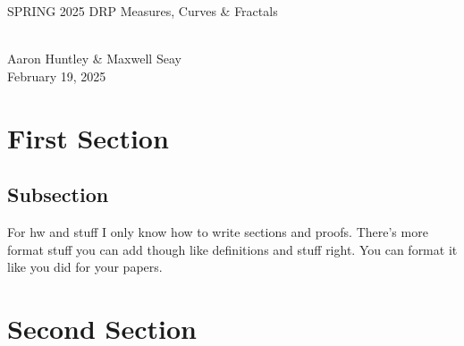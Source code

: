 \documentclass[12pt]{extarticle}
\begin{document}
	\begin{center}
		\begin{Huge}
			SPRING 2025 DRP Measures, Curves \& Fractals
		\end{Huge}
		\\[0.1in]
		Aaron Huntley \& Maxwell Seay
		\\[0.1in]
		February 19, 2025
		\\[0.4in]
	\end{center}
    \section{First Section}
    \subsection{Subsection}
	For hw and stuff I only know how to write sections and proofs. There's more format stuff you can add though like definitions and stuff right. You can format it like you did for your papers.
    \section{Second Section}
\end{document}
